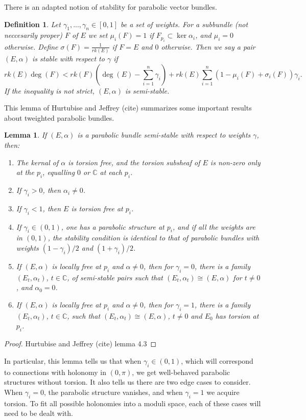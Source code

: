 \documentclass[]{article}
\newtheorem{lemma}{Lemma}
\newtheorem{definition}{Definition}
\newcommand{\C}{\mathbb{C}}
\begin{document}
	There is an adapted notion of stability for parabolic vector bundles.
	\begin{definition}
		Let $\gamma_1,...,\gamma_n \in [0,1]$ be a set of weights. For a subbundle (not neccesarily proper) $F$ of $E$ we set $\mu_i(F) = 1$ if $F_{p_i} \subset \ker\alpha_i$, and $\mu_i = 0$ otherwise. Define $\sigma(F) = \frac{1}{rk(E)}$ if $F=E$ and $0$ otherwise. Then we say a pair $(E,\alpha)$ is \emph{stable} with respect to $\gamma$ if 
		\begin{equation}
		rk(E)\deg(F) < rk(F)\left(\deg(E) - \sum_{i=1}^n \gamma_i\right) 
		+ rk(E)\sum_{i=1}^n(1 - \mu_i(F) + \sigma_i(F))\gamma_i.
		\end{equation}
		If the inequality is not strict, $(E,\alpha)$ is \emph{semi-stable}.
	\end{definition}
	This lemma of Hurtubise and Jeffrey (cite) summarizes some important results about tweighted parabolic bundles.
	\begin{lemma}
		\label{l:ss-lemma}
		If $(E,\alpha)$ is a parabolic bundle semi-stable with respect to weights $\gamma$, then:
		\begin{enumerate}
			\item The kernal of $\alpha$ is torsion free, and the torsion subsheaf of $E$ is non-zero only at the $p_i$, equalling $0$ or $\C$ at each $p_i$.
			\item If $\gamma_i >0$, then $\alpha_i \neq 0$.
			\item If $\gamma_i < 1$, then $E$ is torsion free at $p_i$.
			\item If $\gamma_i \in (0,1)$, one has a parabolic structure at $p_i$, and if all the weights are in $(0,1)$, the stability condition is identical to that of parabolic bundles with weights $(1-\gamma_i)/2$ and $(1+\gamma_i)/2$.
			\item If $(E,\alpha)$ is locally free at $p_i$ and $\alpha \neq 0$, then for $\gamma_i = 0$, there is a family $(E_t, \alpha_t)$, $t\in \C$, of semi-stable pairs such that $(E_t,\alpha_t)\cong (E,\alpha)$ for $t\neq 0$, and $\alpha_0 = 0$. 
			\item If $(E,\alpha)$ is locally free at $p_i$ and $\alpha \neq 0$, then for $\gamma_i = 1$, there is a family $(E_t,\alpha_t)$, $t\in \C$, such that $(E_t, \alpha_t)\cong (E,\alpha)$, $t\neq 0$ and $E_0$ has torsion at $p_i$.
		\end{enumerate}
	\end{lemma}
	\begin{proof}
		Hurtubise and Jeffrey (cite) lemma 4.3
	\end{proof}
	In particular, this lemma tells us that when $\gamma_i\in (0,1)$, which will correspond to connections with holonomy in $(0,\pi)$, we get well-behaved parabolic structures without torsion. It also tells us there are two edge cases to consider. When $\gamma_i = 0$, the parabolic structure vanishes, and when $\gamma_i = 1$ we acquire torsion. To fit all possible holonomies into a moduli space, each of these cases will need to be dealt with.
	
\end{document}
